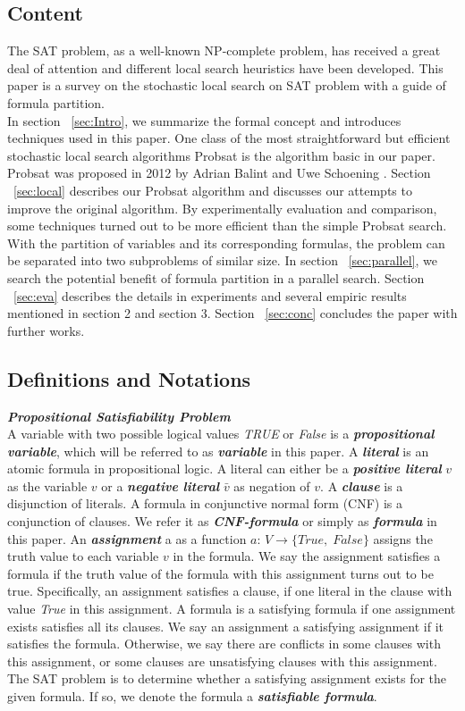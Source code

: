 \documentclass[12pt,a4paper,twoside]{scrartcl}
\numberwithin{equation}{section}
\begin{document}
\subsection{Content} 
The SAT problem, as a well-known NP-complete problem, has received a great deal of attention and different local search heuristics have been developed. This paper is a survey on the stochastic local search on SAT problem with a guide of formula partition. \\
In section ~\ref{sec:Intro}, we summarize the formal concept and introduces techniques used in this paper. 
One class of the most straightforward but efficient stochastic local search algorithms Probsat is the algorithm basic in our paper. Probsat was proposed in 2012 by Adrian Balint and Uwe Schoening \cite{balint2016engineering}. Section ~\ref{sec:local} describes our Probsat algorithm and discusses our attempts to improve the original algorithm. By experimentally evaluation and comparison, some techniques turned out to be more efficient than the simple Probsat search. With the partition of variables and its corresponding formulas, the problem can be separated into two subproblems of similar size.  In section ~\ref{sec:parallel}, we search the potential benefit of formula partition in a parallel search. Section ~\ref{sec:eva} describes the details in experiments and several empiric results mentioned in section 2 and section 3.  Section ~\ref{sec:conc} concludes the paper with further works. 

\subsection{Definitions and Notations} 
\emph{\textbf{Propositional Satisfiability Problem}}\\
A variable with two possible logical values  \textit{TRUE} or  \textit{False} is a \emph{\textbf{propositional variable}}, which will be referred to as \emph{\textbf{variable}} in this paper.
A \emph{\textbf{literal}} is an atomic formula in propositional logic. A literal can either be a \emph{\textbf{positive literal}} $v$ as the variable $v$ or a \emph{\textbf{negative literal}} $\bar{v}$ as negation of $v$.
A \emph{\textbf{clause}} is a disjunction of literals. A formula in conjunctive normal form (CNF) is a conjunction of clauses. We refer it as  \emph{\textbf{CNF-formula}} or simply as \emph{\textbf{formula}} in this paper.
An \emph{\textbf{assignment}} a as a function  $a$: $V\rightarrow \{True {, }\; False\}$ assigns the truth value to each variable $v$ in the formula. We say the assignment satisfies a formula if the truth value of the formula with this assignment turns out to be true. Specifically, an assignment satisfies a clause, if one literal in the clause with value  \textit{True} in this assignment. A formula is a satisfying formula if one assignment exists satisfies all its clauses. We say an assignment a satisfying assignment if it satisfies the formula. Otherwise, we say there are conflicts in some clauses with this assignment, or some clauses are unsatisfying clauses with this assignment. 
The SAT problem is to determine whether a satisfying assignment exists for the given formula. If so, we denote the formula a \emph{\textbf{satisfiable formula}}. 
\end{document}
